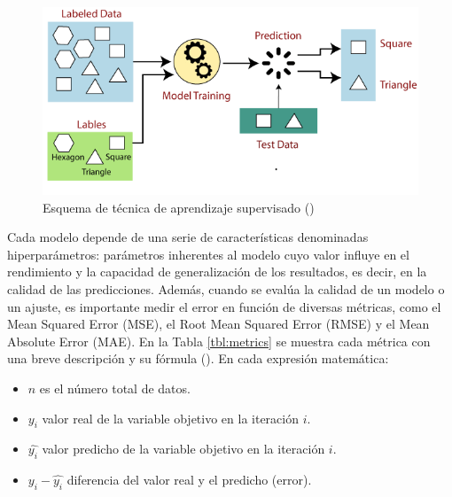 \documentclass[12pt,a4paper]{report}
\begin{document}
\begin{figure}[H]
    \centering
    \includegraphics[width=1\textwidth]{Images/tfm-2.3.png}
    \caption{Esquema de técnica de aprendizaje supervisado (\cite{javatpoint_supervised_ml})}
    \label{fig:MLSup}
\end{figure}

Cada modelo depende de una serie de características denominadas hiperparámetros: parámetros inherentes al modelo cuyo valor influye en el rendimiento y la capacidad de generalización de los resultados, es decir, en la calidad de las predicciones. Además, cuando se evalúa la calidad de un modelo o un ajuste, es importante medir el error en función de diversas métricas, como el Mean Squared Error (MSE), el Root Mean Squared Error (RMSE) y el Mean Absolute Error (MAE). En la Tabla \ref{tbl:metrics} se muestra cada métrica con una breve descripción y su fórmula (\cite{arrioja2021}). En cada expresión matemática:

\begin{itemize}
    \item $n$ es el número total de datos.
    \item $y_i$ valor real de la variable objetivo en la iteración $i$.
    \item $\hat{y_i}$ valor predicho de la variable objetivo en la iteración $i$.
    \item $y_i - \hat{y_i}$ diferencia del valor real y el predicho (error).
\end{itemize}
\end{document}
